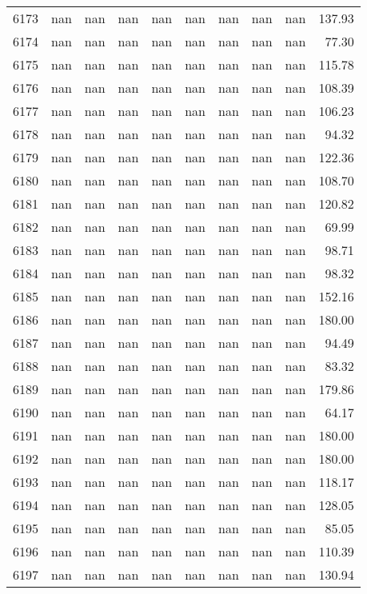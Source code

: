 \begin{tabular}{lrrrrrrrrr}
6173 & nan & nan & nan & nan & nan & nan & nan & nan & 137.93 \\
6174 & nan & nan & nan & nan & nan & nan & nan & nan & 77.30 \\
6175 & nan & nan & nan & nan & nan & nan & nan & nan & 115.78 \\
6176 & nan & nan & nan & nan & nan & nan & nan & nan & 108.39 \\
6177 & nan & nan & nan & nan & nan & nan & nan & nan & 106.23 \\
6178 & nan & nan & nan & nan & nan & nan & nan & nan & 94.32 \\
6179 & nan & nan & nan & nan & nan & nan & nan & nan & 122.36 \\
6180 & nan & nan & nan & nan & nan & nan & nan & nan & 108.70 \\
6181 & nan & nan & nan & nan & nan & nan & nan & nan & 120.82 \\
6182 & nan & nan & nan & nan & nan & nan & nan & nan & 69.99 \\
6183 & nan & nan & nan & nan & nan & nan & nan & nan & 98.71 \\
6184 & nan & nan & nan & nan & nan & nan & nan & nan & 98.32 \\
6185 & nan & nan & nan & nan & nan & nan & nan & nan & 152.16 \\
6186 & nan & nan & nan & nan & nan & nan & nan & nan & 180.00 \\
6187 & nan & nan & nan & nan & nan & nan & nan & nan & 94.49 \\
6188 & nan & nan & nan & nan & nan & nan & nan & nan & 83.32 \\
6189 & nan & nan & nan & nan & nan & nan & nan & nan & 179.86 \\
6190 & nan & nan & nan & nan & nan & nan & nan & nan & 64.17 \\
6191 & nan & nan & nan & nan & nan & nan & nan & nan & 180.00 \\
6192 & nan & nan & nan & nan & nan & nan & nan & nan & 180.00 \\
6193 & nan & nan & nan & nan & nan & nan & nan & nan & 118.17 \\
6194 & nan & nan & nan & nan & nan & nan & nan & nan & 128.05 \\
6195 & nan & nan & nan & nan & nan & nan & nan & nan & 85.05 \\
6196 & nan & nan & nan & nan & nan & nan & nan & nan & 110.39 \\
6197 & nan & nan & nan & nan & nan & nan & nan & nan & 130.94 \\

\end{tabular}
